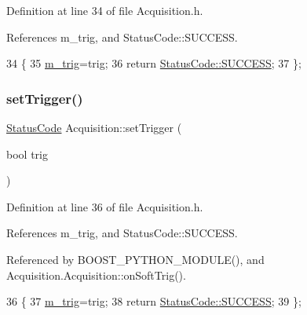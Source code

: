 Definition at line 34 of file Acquisition.\+h.



References m\+\_\+trig, and Status\+Code\+::\+S\+U\+C\+C\+E\+SS.


\begin{DoxyCode}
34                                    \{
35     \hyperlink{classAcquisition_a953bdc1bf56206b6df33b648af32a24f}{m\_trig}=trig; 
36     \textcolor{keywordflow}{return} \hyperlink{classStatusCode_a6f565cbeadc76d14c72f047e5e85eb4badd0da38d3ba0d922efd1f4619bc37ad8}{StatusCode::SUCCESS};
37   \};
\end{DoxyCode}
\mbox{\label{classAcquisition_acdb167b43f3babb59a98698aa5c5066f}} 
\subsubsection{\texorpdfstring{set\+Trigger()}{setTrigger()}\hspace{0.1cm}{\footnotesize\ttfamily [2/2]}}
{\footnotesize\ttfamily \hyperlink{classStatusCode}{Status\+Code} Acquisition\+::set\+Trigger (\begin{DoxyParamCaption}\item[{bool}]{trig }\end{DoxyParamCaption})\hspace{0.3cm}{\ttfamily [inline]}}



Definition at line 36 of file Acquisition.\+h.



References m\+\_\+trig, and Status\+Code\+::\+S\+U\+C\+C\+E\+SS.



Referenced by B\+O\+O\+S\+T\+\_\+\+P\+Y\+T\+H\+O\+N\+\_\+\+M\+O\+D\+U\+L\+E(), and Acquisition.\+Acquisition\+::on\+Soft\+Trig().


\begin{DoxyCode}
36                                    \{
37     \hyperlink{classAcquisition_a953bdc1bf56206b6df33b648af32a24f}{m\_trig}=trig; 
38     \textcolor{keywordflow}{return} \hyperlink{classStatusCode_a6f565cbeadc76d14c72f047e5e85eb4badd0da38d3ba0d922efd1f4619bc37ad8}{StatusCode::SUCCESS};
39   \};
\end{DoxyCode}
\mbox{\label{classAcquisition_a9af304e0fb2076cd4f92703708efe83e}} 
